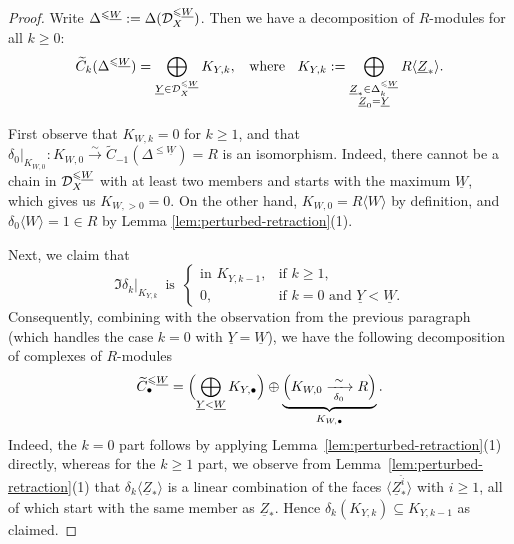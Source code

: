 \documentclass[a4paper,leqno]{amsart}
\begin{document}
\begin{proof}
Write $\Delta^{\leqslant \underline{W}}:= \Delta(\mathcal D_X^{\leqslant \underline{W}})$.
Then we have a decomposition of $R$-modules for all $k\ge 0$:
\[
\widetilde{C}_k(\Delta^{\leqslant\underline{W}})=\bigoplus_{\underline{Y}\in\mathcal D_X^{\leqslant\underline{W}}}K_{Y,k}, \;\;\text{ where }\;\; K_{Y,k}:= \bigoplus_{\substack{\underline{Z}_\ast\in \Delta^{\leqslant \underline{W}}_k\\\underline{Z}_0=\underline{Y}}}  R\langle \underline{Z}_\ast \rangle.
\]

First observe that $K_{W,k}=0$ for $k\ge 1$, and that $\delta_0|_{K_{W,0}}:K_{W,0}\xrightarrow{\sim} \widetilde{C}_{-1}(\Delta^{\le\underline{W}}) = R$ is an isomorphism.  Indeed, there cannot be a chain in $\mathcal D_X^{\leqslant\underline{W}}$ with at least two members and starts with the maximum $\underline{W}$, which gives us $K_{W,>0}=0$.  On the other hand, $K_{W,0}=R\langle W\rangle$ by definition, and $\delta_0\langle W\rangle = 1\in R$ by Lemma \ref{lem:perturbed-retraction}(1).

Next, we claim that
\[
 \Im\delta_k|_{K_{Y,k}} \,\text{ is }\,
 \begin{cases}
 \text{in } K_{Y,k-1}, & \text{if }k\geq1,\\
 0, & \text{if }k=0 \text{ and } \underline{Y}<\underline{W}.
 \end{cases}
\]
Consequently, combining with the observation from the previous paragraph (which handles the case $k=0$ with $\underline{Y}=\underline{W}$), we have the following decomposition of complexes of $R$-modules 
\begin{equation}
 \widetilde{C}^{\leq\underline{W}}_\bullet=\Bigl(\bigoplus_{\underline{Y}<\underline{W}}K_{Y,\bullet}\Bigr)\oplus \underbrace{\Bigl(K_{W,0}\xrightarrow[\delta_0]{\ \sim\ }R\Bigr)}_{K_{W,\bullet}}.
 \label{eq:perturbed-lower-decomposition}
\end{equation}
Indeed, the $k=0$ part follows by applying Lemma~\ref{lem:perturbed-retraction}\textup{(1)} directly, whereas for the $k\geq1$ part, we observe from Lemma~\ref{lem:perturbed-retraction}\textup{(1)} that $\delta_k\langle\underline{Z}_\ast\rangle$ is a linear combination of the faces $\langle\underline{Z}_\ast^{\widehat{i}}\rangle$ with $i\geq1$, all of which start with the same member as $\underline{Z}_\ast$.  Hence $\delta_k(K_{Y,k})\subseteq K_{Y,k-1}$ as claimed.


\end{proof}
\end{document}
